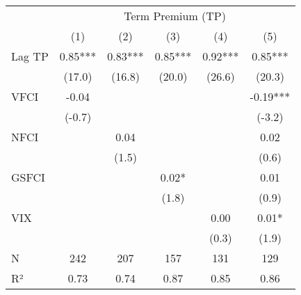 \begingroup
\fontsize{12.0pt}{14.4pt}\selectfont
\begin{tabular}{lccccc}
\toprule
 & \multicolumn{5}{c}{Term Premium (TP)} \\ 
\cmidrule(lr){2-6}
  & (1) & (2) & (3) & (4) & (5) \\ 
\midrule\addlinespace[2.5pt]
Lag TP & 0.85*** & 0.83*** & 0.85*** & 0.92*** & 0.85*** \\ 
 & (17.0) & (16.8) & (20.0) & (26.6) & (20.3) \\ 
VFCI & -0.04 &  &  &  & -0.19*** \\ 
 & (-0.7) &  &  &  & (-3.2) \\ 
NFCI &  & 0.04 &  &  & 0.02 \\ 
 &  & (1.5) &  &  & (0.6) \\ 
GSFCI &  &  & 0.02* &  & 0.01 \\ 
 &  &  & (1.8) &  & (0.9) \\ 
VIX &  &  &  & 0.00 & 0.01* \\ 
{} & {} & {} & {} & {(0.3)} & {(1.9)} \\ 
\midrule\addlinespace[2.5pt]
  N & 242 & 207 & 157 & 131 & 129 \\ 
R² & 0.73 & 0.74 & 0.87 & 0.85 & 0.86 \\ 
\bottomrule
\end{tabular}
\endgroup

